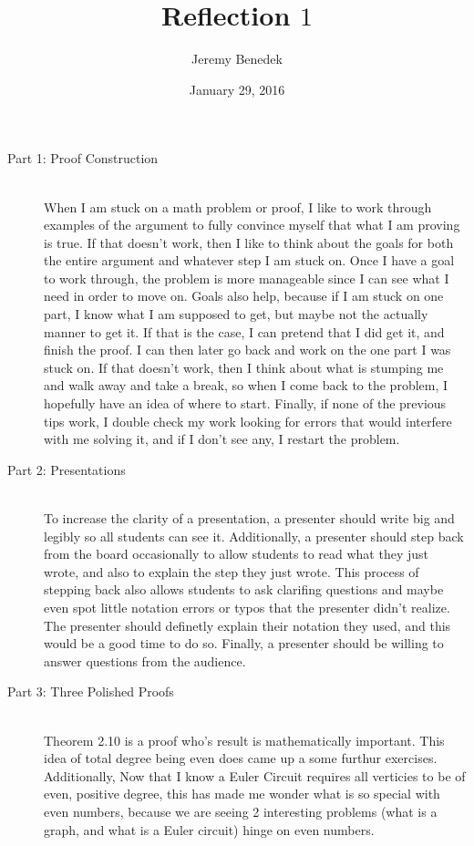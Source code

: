 \documentclass{article}
\title{Reflection $1$}
\author{Jeremy Benedek}
\date{January 29, 2016}
\begin{document}
\maketitle

\begin{description}
	\item[Part 1: Proof Construction] \hfill \\
		When I am stuck on a math problem or proof, I like to work through examples of the argument to fully convince myself that
		what I am proving is true. If that doesn't work, then I like to think about the goals for both the entire argument 
		and whatever step I am stuck on. Once I have a goal to
		work through, the problem is more manageable since I can see what I need in order to move on. Goals also help, because if I am stuck
		on one part, I know what I am supposed to get, but maybe not the actually manner to get it. If that is the case, I can pretend
		that I did get it, and finish the proof. I can then later go back and work on the one part I was stuck on. 
		If that doesn't work, then I think about what is stumping me and walk away and take a break, so when I come back to the problem, I 
		hopefully have an idea of where to start.
		Finally, if none of the previous tips work, I double check my work looking for errors
		that would interfere with  me solving it, and if I don't see any, I restart the problem.  
	\item[Part 2: Presentations] \hfil \\
		To increase the clarity of a presentation, a presenter should write big and legibly so all students can see it. Additionally, 
		a presenter should step back from the board occasionally to allow students to read what they just wrote, and also to explain 
		the step they just wrote. This process of stepping back also allows students to ask clarifing questions and maybe even spot
		little notation errors or typos that the presenter didn't realize. The presenter should definetly explain their notation they used,
		and this would be a good time to do so.  Finally, a presenter should be willing to answer questions 
		from the audience.  
	
	\item[Part 3: Three Polished Proofs] \hfil \\
		Theorem 2.10 is a proof who's result is mathematically important. This idea of total degree being even does came up a some furthur exercises. Additionally, Now that I know a Euler Circuit requires all verticies to be of even, positive degree, this has made me wonder what is so special with even numbers, because we are seeing 2 interesting problems (what is a graph, and what is a Euler circuit) hinge on even numbers.
		

\end{description}
\end{document}
